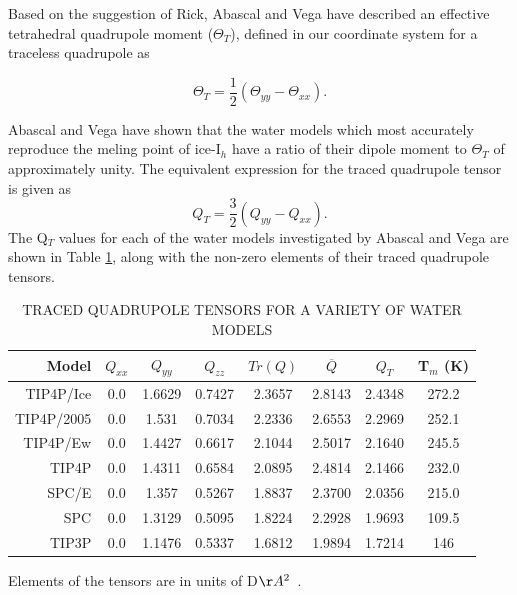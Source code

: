 Based on the suggestion of Rick\cite{Rick2004}, Abascal and Vega have
described an effective tetrahedral quadrupole moment ($\Theta_T$),
defined in our coordinate system for a traceless quadrupole as

\begin{equation}
\Theta_{T} = \frac{1}{2}(\Theta_{yy} - \Theta_{xx}).
\end{equation} 

Abascal and Vega have shown that the water models which most accurately
reproduce the meling point of ice-I$_h$ have a ratio of their dipole moment
to $\Theta_T$ of approximately unity. The equivalent expression for the 
traced quadrupole tensor is given as
\begin{equation}
Q_{T} = \frac{3}{2}(Q_{yy} - Q_{xx}).
\end{equation}
The Q$_T$ values for each of the water models
investigated by Abascal and Vega are shown in Table \ref{Models_quad}, along 
with the non-zero elements of their traced quadrupole tensors.

\begin{table}[h!]
\caption{TRACED QUADRUPOLE TENSORS FOR A VARIETY OF WATER MODELS}
\label{Models_quad}
\begin{tabular}{rccccccc}
\hline\hline
Model & $Q_{xx}$ & $Q_{yy}$ & $Q_{zz}$ & $Tr(Q)$ & $\overline{Q}$ & $Q_{T}$ &
                                                                    T$_{m}$ (K) \\
\hline 
TIP4P/Ice & 0.0 & 1.6629 & 0.7427 & 2.3657 & 2.8143 & 2.4348  & 272.2 \\
TIP4P/2005 & 0.0 & 1.531 & 0.7034 & 2.2336 & 2.6553 & 2.2969  & 252.1 \\
TIP4P/Ew & 0.0 & 1.4427 & 0.6617 & 2.1044  & 2.5017 & 2.1640  & 245.5   \\
TIP4P & 0.0 & 1.4311 & 0.6584 & 2.0895 & 2.4814 & 2.1466 & 232.0 \\
SPC/E & 0.0 & 1.357 & 0.5267 & 1.8837 & 2.3700 & 2.0356 & 215.0 \\
SPC & 0.0 & 1.3129 & 0.5095 & 1.8224 & 2.2928 & 1.9693 & 109.5 \\
TIP3P & 0.0 & 1.1476 & 0.5337 & 1.6812 & 1.9894 & 1.7214 & 146 \\
\hline \hline
\end{tabular}
\begin{flushleft}
Elements of the tensors are in units of D$\AA^{2}$~. \\
\end{flushleft}
\end{table} 

